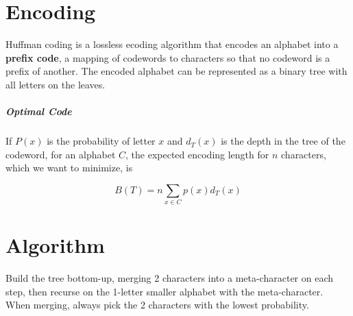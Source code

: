 \documentclass[11pt]{article}
\begin{document}
\section{Encoding}
	Huffman coding is a lossless ecoding algorithm that encodes an alphabet into a \textbf{prefix code}, a mapping of codewords to characters so that no codeword is a prefix of another. The encoded alphabet can be represented as a binary tree with all letters on the leaves.
	
	\begin{center}
	\end{center}
	
	\subparagraph{Optimal Code} If $P(x)$ is the probability of letter $x$ and $d_T(x)$ is the depth in the tree of the codeword, for an alphabet $C$, the expected encoding length for $n$ characters, which we want to minimize, is
	
	\begin{equation}
		B(T) = n\sum_{x\in C} p(x)d_T(x)
	\end{equation}
	
\section{Algorithm}
	Build the tree bottom-up, merging 2 characters into a meta-character on each step, then recurse on the 1-letter smaller alphabet with the meta-character. When merging, always pick the 2 characters with the lowest probability.
	
\end{document}
